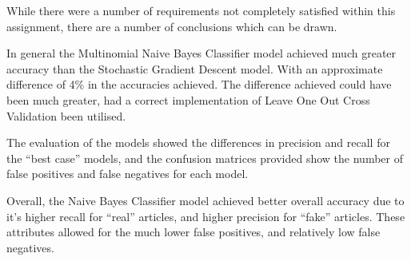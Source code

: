 While there were a number of requirements not completely satisfied within this
assignment, there are a number of conclusions which can be drawn.

\par In general the Multinomial Naive Bayes Classifier model achieved much
greater accuracy than the Stochastic Gradient Descent model. With an approximate
difference of 4\% in the accuracies achieved. The difference achieved could have
been much greater, had a correct implementation of Leave One Out Cross
Validation been utilised.

\par The evaluation of the models showed the differences in precision and
recall for the ``best case'' models, and the confusion matrices provided show
the number of false positives and false negatives for each model.

\par Overall, the Naive Bayes Classifier model achieved better overall accuracy
due to it's higher recall for ``real'' articles, and higher precision for
``fake'' articles. These attributes allowed for the much lower false positives,
and relatively low false negatives.
